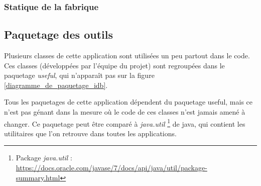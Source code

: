 \subsubsection{Statique de la fabrique}


\subsection{Paquetage des outils}
Plusieurs classes de cette application sont utilisées un peu partout dans le code.
Ces classes (développées par l'équipe du projet) sont regroupées dans le paquetage \textit{useful}, qui n'apparaît pas sur la figure \ref{diagramme_de_paquetage_idb}.

Tous les paquetages de cette application dépendent du paquetage useful, mais ce n'est pas génant dans la mesure où le code de ces classes n'est jamais amené à changer.
Ce paquetage peut être comparé à \textit{java.util}
\footnote{\label{paguetage_java_util}Package \textit{java.util} : \url{https://docs.oracle.com/javase/7/docs/api/java/util/package-summary.html}}
de java, qui contient les utilitaires que l'on retrouve dans toutes les applications.
